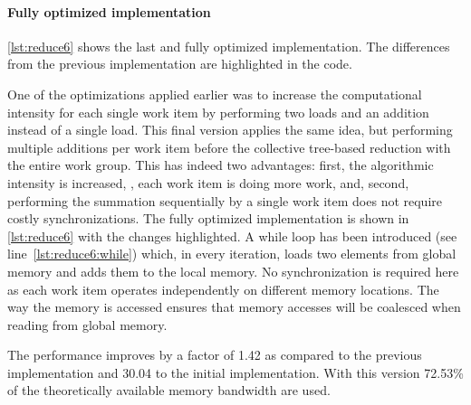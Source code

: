\paragraph{Fully optimized implementation}

\autoref{lst:reduce6} shows the last and fully optimized implementation.
The differences from the previous implementation are highlighted in the code.

One of the optimizations applied earlier was to increase the computational intensity for each single work item by performing two loads and an addition instead of a single load.
This final version applies the same idea, but performing multiple additions per work item before the collective tree-based reduction with the entire work group.
This has indeed two advantages:
first, the algorithmic intensity is increased, \ie, each work item is doing more work,
and, second, performing the summation sequentially by a single work item does not require costly synchronizations.
The fully optimized implementation is shown in \autoref{lst:reduce6} with the changes highlighted.
A while loop has been introduced (see line~\ref{lst:reduce6:while}) which, in every iteration, loads two elements from global memory and adds them to the local memory.
No synchronization is required here as each work item operates independently on different memory locations.
The way the memory is accessed ensures that memory accesses will be coalesced when reading from global memory.

The performance improves by a factor of 1.42 as compared to the previous implementation and 30.04 to the initial implementation.
With this version 72.53\% of the theoretically available memory bandwidth are used.

